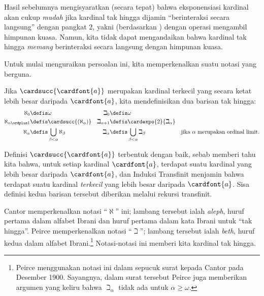 \documentclass[../../../include/open-logic-section]{subfiles}
\begin{document}


Hasil sebelumnya mengisyaratkan (secara tepat) bahwa eksponensiasi kardinal
akan cukup \emph{mudah} jika kardinal tak hingga dijamin ``berinteraksi
secara langsung'' dengan pangkat $2$, yakni (berdasarkan
) dengan operasi mengambil himpunan kuasa.
Namun, kita tidak dapat mengandaikan bahwa kardinal tak hingga \emph{memang}
berinteraksi secara langsung dengan himpunan kuasa.

Untuk mulai menguraikan persoalan ini, kita memperkenalkan suatu notasi yang
berguna.

\begin{defn}
Jika $\cardsucc{\cardfont{a}}$ merupakan kardinal terkecil yang secara ketat
lebih besar daripada $\cardfont{a}$, kita mendefinisikan dua barisan tak
hingga:
\begin{align*}
	\aleph_{0} &\defis \omega & 		
	\beth_{0} &\defis \omega\\
	\aleph_{\alpha \ordplus 1} &\defis \cardsucc{(\aleph_{\alpha})} &
	\beth_{\alpha+1} &\defis \cardexpo{2}{\beth_{\alpha}}\\
	\aleph_{\alpha} &\defis \bigcup_{\beta< \alpha} \aleph_{\beta} &
	\beth_{\alpha} &\defis \bigcup_{\beta < \alpha}\beth_{\beta} & \text{jika $\alpha$ merupakan ordinal limit}.
	\end{align*}
\end{defn}

Definisi $\cardsucc{\cardfont{a}}$ terbentuk dengan baik, sebab
 memberi tahu kita bahwa,
untuk setiap kardinal $\cardfont{a}$, terdapat suatu kardinal yang lebih
besar daripada $\cardfont{a}$, dan Induksi Transfinit menjamin bahwa terdapat
suatu kardinal \emph{terkecil} yang lebih besar daripada $\cardfont{a}$.
Sisa definisi kedua barisan tersebut diberikan melalui rekursi transfinit.

Cantor memperkenalkan notasi ``$\aleph$'' ini; lambang tersebut ialah
\emph{aleph}, huruf pertama dalam alfabet Ibrani dan huruf pertama dalam kata
Ibrani untuk ``tak hingga''. Peirce memperkenalkan notasi ``$\beth$'';
lambang tersebut ialah \emph{beth}, huruf kedua dalam alfabet
Ibrani.\footnote{Peirce menggunakan notasi ini dalam sepucuk surat kepada
Cantor pada Desember 1900. Sayangnya, dalam surat tersebut Peirce juga
memberikan argumen yang keliru bahwa $\beth_\alpha$ tidak ada untuk
$\alpha \geq \omega$.} Notasi-notasi ini memberi kita kardinal tak hingga.
\end{document}
